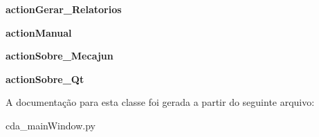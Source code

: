 \begin{DoxyCompactItemize}
\item 
\hypertarget{classcda__mainWindow_1_1Ui__Controle__De__Acesso__Window_ab5b11a4d1db6c291677623985ca524e3}{{\bfseries action\-Gerar\-\_\-\-Relatorios}}\label{classcda__mainWindow_1_1Ui__Controle__De__Acesso__Window_ab5b11a4d1db6c291677623985ca524e3}

\item 
\hypertarget{classcda__mainWindow_1_1Ui__Controle__De__Acesso__Window_aab758bd507a64bfb6bb3fad95debce7a}{{\bfseries action\-Manual}}\label{classcda__mainWindow_1_1Ui__Controle__De__Acesso__Window_aab758bd507a64bfb6bb3fad95debce7a}

\item 
\hypertarget{classcda__mainWindow_1_1Ui__Controle__De__Acesso__Window_a67f6cb57701de203704f81178ef762e1}{{\bfseries action\-Sobre\-\_\-\-Mecajun}}\label{classcda__mainWindow_1_1Ui__Controle__De__Acesso__Window_a67f6cb57701de203704f81178ef762e1}

\item 
\hypertarget{classcda__mainWindow_1_1Ui__Controle__De__Acesso__Window_a3435cfb4e1b768a4d1261a2c6b9b382c}{{\bfseries action\-Sobre\-\_\-\-Qt}}\label{classcda__mainWindow_1_1Ui__Controle__De__Acesso__Window_a3435cfb4e1b768a4d1261a2c6b9b382c}

\end{DoxyCompactItemize}


\-A documentação para esta classe foi gerada a partir do seguinte arquivo\-:\begin{DoxyCompactItemize}
\item 
cda\-\_\-main\-Window.\-py\end{DoxyCompactItemize}
